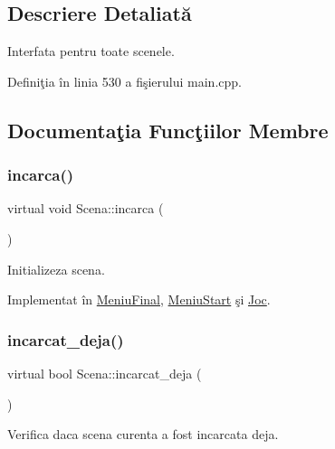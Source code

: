 \subsection{Descriere Detaliată}
Interfata pentru toate scenele. 

Definiţia în linia 530 a fişierului main.\+cpp.



\subsection{Documentaţia Funcţiilor Membre}
\mbox{\label{classScena_a6f53a1dcef68084361dc8f9d56bbb8c0}} 
\subsubsection{\texorpdfstring{incarca()}{incarca()}}
{\footnotesize\ttfamily virtual void Scena\+::incarca (\begin{DoxyParamCaption}\item[{\hyperlink{classStadiulJocului}{Stadiul\+Jocului} \&}]{ }\end{DoxyParamCaption})\hspace{0.3cm}{\ttfamily [pure virtual]}}

Initializeza scena. 

Implementat în \hyperlink{classMeniuFinal_a4a1f2a872c6d0cef0e3f0a8e1545f5de}{Meniu\+Final}, \hyperlink{classMeniuStart_afb59dcb21968a6ccd685a6c9c0d6a0c1}{Meniu\+Start} şi \hyperlink{classJoc_a54976207efdeeb45b42fd639215b65e3}{Joc}.

\mbox{\label{classScena_ac8de771024795dffa0e5feb8dba881ff}} 
\subsubsection{\texorpdfstring{incarcat\+\_\+deja()}{incarcat\_deja()}}
{\footnotesize\ttfamily virtual bool Scena\+::incarcat\+\_\+deja (\begin{DoxyParamCaption}{ }\end{DoxyParamCaption})\hspace{0.3cm}{\ttfamily [pure virtual]}}

Verifica daca scena curenta a fost incarcata deja. 

